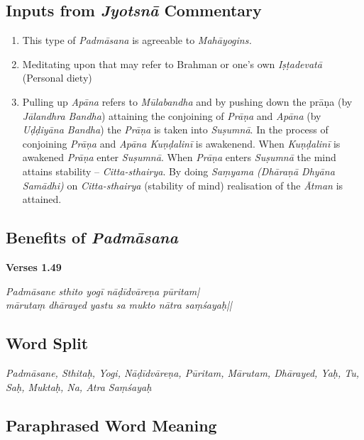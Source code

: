 \subsection*{Inputs from \textit{Jyotsnā} Commentary}


\begin{enumerate}
\item This type of \textit{Padmāsana} is agreeable to \textit{Mahāyogins.} 
\item Meditating upon that may refer to Brahman or one’s own \textit{Iṣṭadevatā} (Personal diety)
\item Pulling up \textit{Apāna} refers to \textit{Mūlabandha} and by pushing down the prāṇa (by \textit{Jālandhra Bandha}) attaining the conjoining of \textit{Prāṇa} and \textit{Apāna} (by \textit{Uḍḍiyāna Bandha}) the \textit{Prāṇa} is taken into \textit{Suṣumnā}. In the process of conjoining \textit{Prāṇa} and \textit{Apāna Kuṇḍalinī} is awakenend. When \textit{Kuṇḍalinī} is awakened \textit{Prāṇa} enter \textit{Suṣumnā}. When \textit{Prāṇa} enters \textit{Suṣumnā} the mind attains stability – \textit{Citta-sthairya}. By doing \textit{Saṃyama (Dhāraṇā Dhyāna Samādhi)} on \textit{Citta-sthairya} (stability of mind) realisation of the \textit{Ātman} is attained.
\end{enumerate}

\subsection*{Benefits of \textit{Padmāsana}}


\noindent \textbf{Verses 1.49}

\begin{shloka}
\textit{Padmāsane sthito yogī nāḍīdvāreṇa pūritam|\\
mārutaṃ dhārayed yastu sa mukto nātra saṃśayaḥ||}
\end{shloka}

\subsection*{Word Split}


\textit{Padmāsane, Sthitaḥ, Yogi, Nāḍīdvāreṇa, Pūritam, Mārutam, Dhārayed, Yaḥ, Tu, Saḥ, Muktaḥ, Na, Atra Saṃśayaḥ}

\subsection*{Paraphrased Word Meaning}


